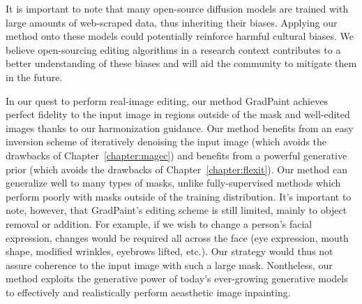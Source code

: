 It is important to note that many open-source diffusion models are trained with large amounts of web-scraped data, thus 
inheriting their biases. Applying our method onto these models could potentially reinforce harmful cultural biases. We 
believe open-sourcing editing algorithms in a research context contributes to a better understanding of these biases and 
will aid the community to mitigate them in the future.

In our quest to perform real-image editing, our method GradPaint achieves perfect fidelity to the input image in regions outside 
of the mask and well-edited images thanks to our harmonization guidance. Our method benefits from an easy inversion scheme of 
iteratively denoising the input image (which avoids the drawbacks of Chapter~\ref{chapter:magec}) and benefits from a powerful generative 
prior (which avoids the drawbacks of Chapter~\ref{chapter:flexit}). Our method can generalize well to many types of masks, 
unlike fully-supervised methods which perform poorly with masks outside of the training distribution. 
It's important to note, however, that GradPaint's editing scheme is still limited, mainly to object removal or addition. For example, 
if we wish to change a person's facial 
expression, changes would be required all across the face (eye expression, mouth shape, modified wrinkles, eyebrows lifted, etc.). 
Our strategy would thus not assure coherence to the input image with such a large mask. Nontheless,
our method exploits the generative power of today's ever-growing generative models to effectively and realistically 
perform aeasthetic image inpainting.